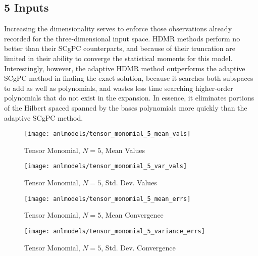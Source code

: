 \subsection{5 Inputs}
Increasing the dimensionality serves to enforce those observations already recorded for the three-dimensional
input space.  HDMR methods perform no better than their SCgPC counterparts, and because of their truncation
are limited in their ability to converge the statistical moments for this model.  Interestingly, however, the
adaptive HDMR method outperforms the adaptive SCgPC method in finding the exact solution, because it searches
both subspaces to add as well as polynomials, and wastes less time searching higher-order polynomials that do
not exist in the expansion.  In essence, it eliminates portions of the Hilbert spaced spanned by the
bases polynomials more quickly than the adaptive SCgPC method.
\begin{figure}[H]
  \centering
  \texttt{[image: anlmodels/tensor\_monomial\_5\_mean\_vals]}
  \caption{Tensor Monomial, $N=5$, Mean Values}
  \label{fig:tensormono mean values 5}
\end{figure}
\begin{figure}[H]
  \centering
  \texttt{[image: anlmodels/tensor\_monomial\_5\_var\_vals]}
  \caption{Tensor Monomial, $N=5$, Std. Dev. Values}
  \label{fig:tensormono var values 5}
\end{figure}

\begin{figure}[H]
  \centering
  \texttt{[image: anlmodels/tensor\_monomial\_5\_mean\_errs]}
  \caption{Tensor Monomial, $N=5$, Mean Convergence}
  \label{fig:tensormono mean errors 5}
\end{figure}
\begin{figure}[H]
  \centering
  \texttt{[image: anlmodels/tensor\_monomial\_5\_variance\_errs]}
  \caption{Tensor Monomial, $N=5$, Std. Dev. Convergence}
  \label{fig:tensormono var errors 5}
\end{figure}

